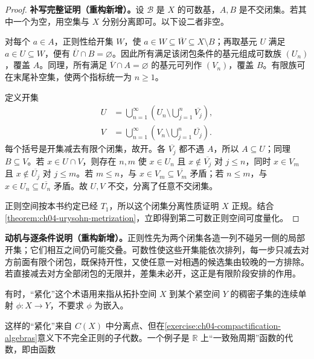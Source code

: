 \documentclass[../../main.tex]{subfiles}
\begin{document}
\begin{proof}
\textbf{补写完整证明（重构新增）。}设 $\mathcal B$ 是 $X$ 的可数基，$A,B$ 是不交闭集。若其中一个为空，用空集与 $X$ 分别分离即可。以下设二者非空。

对每个 $a\in A$，正则性给开集 $W$，使 $a\in W\subseteq\overline W\subseteq X\setminus B$；再取基元 $U$ 满足 $a\in U\subseteq W$，便有 $\overline U\cap B=\varnothing$。因此所有满足该闭包条件的基元组成可数族 $(U_n)$，覆盖 $A$。同理，所有满足 $\overline V\cap A=\varnothing$ 的基元可列作 $(V_n)$，覆盖 $B$。有限族可在末尾补空集，使两个指标统一为 $n\ge1$。

定义开集
\begin{align*}
U&=\bigcup_{n=1}^{\infty}\left(U_n\setminus\bigcup_{j=1}^n\overline{V_j}\right),\\
V&=\bigcup_{n=1}^{\infty}\left(V_n\setminus\bigcup_{j=1}^n\overline{U_j}\right).
\end{align*}
每个括号是开集减去有限个闭集，故开。各 $\overline{V_j}$ 都不遇 $A$，所以 $A\subseteq U$；同理 $B\subseteq V$。若 $x\in U\cap V$，则存在 $n,m$ 使 $x\in U_n$ 且 $x\notin\overline{V_j}$ 对 $j\le n$，同时 $x\in V_m$ 且 $x\notin\overline{U_j}$ 对 $j\le m$。若 $m\le n$，与 $x\in V_m\subseteq\overline{V_m}$ 矛盾；若 $n\le m$，与 $x\in U_n\subseteq\overline{U_n}$ 矛盾。故 $U,V$ 不交，分离了任意不交闭集。

正则空间按本书约定已经 $T_1$，所以这个闭集分离性质证明 $X$ 正规。结合\cref{theorem:ch04-urysohn-metrization}，立即得到第二可数正则空间可度量化。
\end{proof}
\begin{remark}
\textbf{动机与逐条件说明（重构新增）。}正则性先为两个闭集各造一列不碰另一侧的局部开集；它们相互之间仍可能交叠。可数性使这些开集能依次排列，每一步只减去对方前面有限个闭包，既保持开性，又使任意一对相遇的候选集由较晚的一方排除。若直接减去对方全部闭包的无限并，差集未必开，这正是有限阶段安排的作用。
\end{remark}
\begin{definition}[“紧化”的另一种用法]\label{definition:ch04-weaker-compactification}
有时，“紧化”这个术语用来指从拓扑空间 $X$ 到某个紧空间 $Y$ 的稠密子集的连续单射 $\phi:X\to Y$，不要求 $\phi$ 为嵌入。
\end{definition}
这样的“紧化”来自 $C(X)$ 中分离点、但在\cref{exercise:ch04-compactification-algebras}意义下不完全正则的子代数。一个例子是 $\mathbb R$ 上“一致殆周期”函数的代数，即由函数
\end{document}
